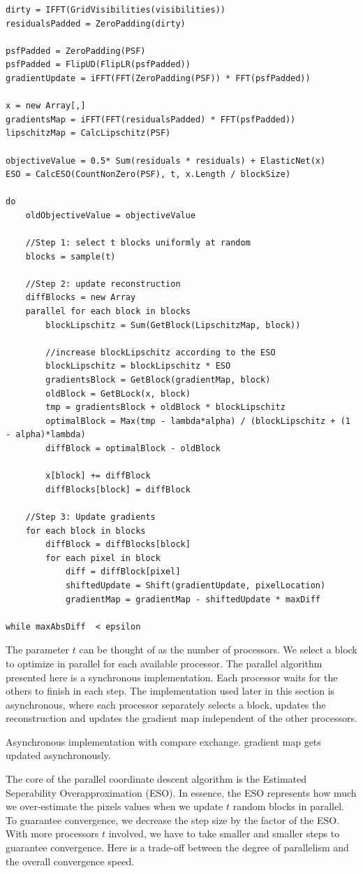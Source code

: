 \begin{lstlisting}
dirty = IFFT(GridVisibilities(visibilities))
residualsPadded = ZeroPadding(dirty)

psfPadded = ZeroPadding(PSF)
psfPadded = FlipUD(FlipLR(psfPadded))
gradientUpdate = iFFT(FFT(ZeroPadding(PSF)) * FFT(psfPadded))

x = new Array[,]
gradientsMap = iFFT(FFT(residualsPadded) * FFT(psfPadded))
lipschitzMap = CalcLipschitz(PSF)

objectiveValue = 0.5* Sum(residuals * residuals) + ElasticNet(x)
ESO = CalcESO(CountNonZero(PSF), t, x.Length / blockSize)

do 
	oldObjectiveValue = objectiveValue
	
	//Step 1: select t blocks uniformly at random
	blocks = sample(t)
	
	//Step 2: update reconstruction
	diffBlocks = new Array
	parallel for each block in blocks
		blockLipschitz = Sum(GetBlock(LipschitzMap, block))
		
		//increase blockLipschitz according to the ESO
		blockLipschitz = blockLipschitz * ESO
		gradientsBlock = GetBlock(gradientMap, block)
		oldBlock = GetBLock(x, block)
		tmp = gradientsBlock + oldBlock * blockLipschitz
		optimalBlock = Max(tmp - lambda*alpha) / (blockLipschitz + (1 - alpha)*lambda)
		diffBlock = optimalBlock - oldBlock
		
		x[block] += diffBlock
		diffBlocks[block] = diffBlock
	
	//Step 3: Update gradients
	for each block in blocks
		diffBlock = diffBlocks[block]
		for each pixel in block
			diff = diffBlock[pixel]
			shiftedUpdate = Shift(gradientUpdate, pixelLocation)
			gradientMap = gradientMap - shiftedUpdate * maxDiff
			
while maxAbsDiff  < epsilon
\end{lstlisting}

The parameter $t$ can be thought of as the number of processors. We select a block to optimize in parallel for each available processor. The parallel algorithm presented here is a synchronous implementation. Each processor waits for the others to finish in each step. The implementation used later in this section is asynchronous, where each processor separately selects a block, updates the reconstruction and updates the gradient map independent of the other processors. 

Asynchronous implementation with compare exchange. gradient map gets updated asynchronously.

The core of the parallel coordinate descent algorithm is the Estimated Seperability Overapproximation (ESO). In essence, the ESO represents how much we over-estimate the pixels values when we update $t$ random blocks in parallel. To guarantee convergence, we decrease the step size by the factor of the ESO. With more processors $t$ involved, we have to take smaller and smaller steps to guarantee convergence. Here is a trade-off between the degree of parallelism and the overall convergence speed.

